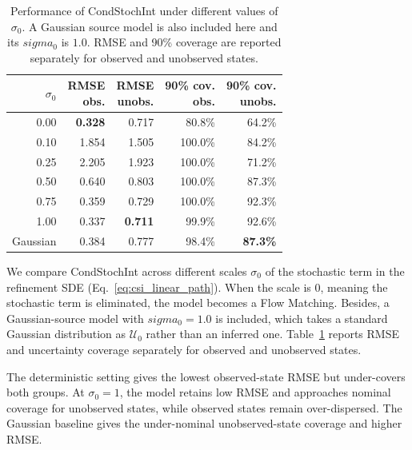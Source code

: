 \begin{table}[htbp]
    \centering
    \begin{minipage}[t]{0.45\textwidth}
        \vspace{0pt}
        \centering
        \caption[Performance of CondStochInt Under Different Score Scales]{Performance of CondStochInt under different values of $\sigma_0$. A Gaussian source model is also included here and its $sigma_0$ is $1.0$. RMSE and 90\% coverage are reported separately for observed and unobserved states.}
        \label{tab:si_sigma0_comparison}
        \small
        \setlength{\tabcolsep}{3pt}
        \begin{tabular}{@{}rrrrr@{}}
            \toprule
            $\sigma_0$ & \makecell{RMSE\\obs.} & \makecell{RMSE\\unobs.} & \makecell{90\% cov.\\obs.} & \makecell{90\% cov.\\unobs.} \\
            \midrule
            0.00 & \textbf{0.328} & 0.717 & 80.8\% & 64.2\% \\
            0.10 & 1.854 & 1.505 & 100.0\% & 84.2\% \\
            0.25 & 2.205 & 1.923 & 100.0\% & 71.2\% \\
            0.50 & 0.640 & 0.803 & 100.0\% & 87.3\% \\
            0.75 & 0.359 & 0.729 & 100.0\% & 92.3\% \\
            1.00 & 0.337 & \textbf{0.711} & 99.9\% & 92.6\% \\
            \midrule
            Gaussian & 0.384 & 0.777 & 98.4\% & \textbf{87.3\%} \\
            \bottomrule
        \end{tabular}
    \end{minipage}
    \hfill
    \begin{minipage}[t]{0.52\textwidth}
        \vspace{0pt}
        We compare CondStochInt across different scales $\sigma_0$ of the stochastic term in the refinement \ac{SDE} (Eq.~\ref{eq:csi_linear_path}). When the scale is $0$, meaning the stochastic term is eliminated, the model becomes a Flow Matching. Besides, a Gaussian-source model with $sigma_0=1.0$ is included, which takes a standard Gaussian distribution as $\mathcal{U}_0$ rather than an inferred one. Table~\ref{tab:si_sigma0_comparison} reports RMSE and uncertainty coverage separately for observed and unobserved states.

        The deterministic setting gives the lowest observed-state RMSE but under-covers both groups. At $\sigma_0=1$, the model retains low RMSE and approaches nominal coverage for unobserved states, while observed states remain over-dispersed. The Gaussian baseline gives the under-nominal unobserved-state coverage and higher RMSE.
    \end{minipage}
\end{table}

